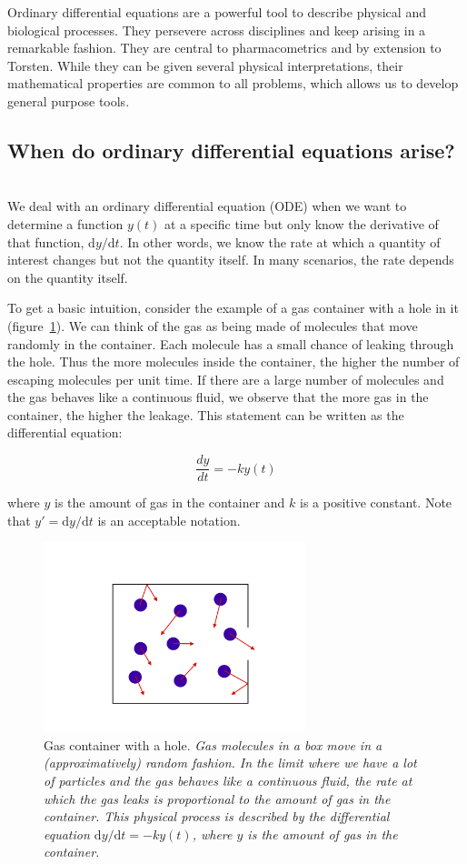 \documentclass[11pt]{amsart}
\begin{document}
Ordinary differential equations are a powerful tool to describe physical and
biological processes. They persevere across disciplines and keep arising in
a remarkable fashion. They are central to pharmacometrics and by 
extension to Torsten. While they can be given several physical interpretations,
their mathematical properties are common to all problems, which allows us to
develop general purpose tools.

\subsection{When do ordinary differential equations arise?} \ \\

We deal with an ordinary differential equation (ODE) when we want to determine a
function $y(t)$ at a specific time but only know the derivative of that function, $\mathrm{d}y/\mathrm{d}t$.
In other words, we know the rate at which a quantity of interest changes but not the quantity 
itself. In many scenarios, the rate depends on the quantity itself.

To get a basic intuition, consider the example of a gas container with a hole in it  
(figure~\ref{GasContainer}). We can think of the gas as being made of molecules that move 
randomly in the container. Each molecule has a small chance of leaking through the hole. Thus
the more molecules inside the container, the higher the number of escaping molecules per unit
time. If there are a large number of molecules and the gas behaves like a continuous fluid, we
observe that the more gas in the container, the higher the leakage. This statement can be 
written as the differential equation:

$$ \frac{dy}{dt} = -ky(t)$$

where $y$ is the amount of gas in the container and $k$ is a positive constant. Note
that $y' = \mathrm{d}y/\mathrm{d}t$ is an acceptable notation.

\begin{figure}[!htb]
\begin{center}
\includegraphics[width=3.0in,trim=0in 0in 0 0in]{graphics/gasInBox.png}
\caption{{Gas container with a hole. \textit{Gas molecules in a box move in a (approximatively)
random fashion. In the limit where we have a lot of particles and the gas behaves like a 
continuous fluid, the rate at which the gas leaks is proportional to the amount of gas in the container.
This physical process is described by the differential equation $ \mathrm{d}y/\mathrm{d}t = -ky(t)$, 
where $y$ is the amount of gas in the container.}}}
\label{GasContainer}
\end{center}
\end{figure}
\end{document}
